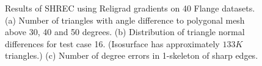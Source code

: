 \begin{figure}[tp]
\centering	


\caption{Results of SHREC using Religrad gradients on 40 Flange datasets. 
(a) Number of triangles with angle difference 
to polygonal mesh above 30, 40 and 50 degrees. 
(b) Distribution of triangle normal differences for test case 16.
(Isosurface has approximately $133K$ triangles.)
(c) Number of degree errors in 1-skeleton of sharp edges.
}

\label{fig:flangeAngle}

\vspace{4em}


\end{figure}

